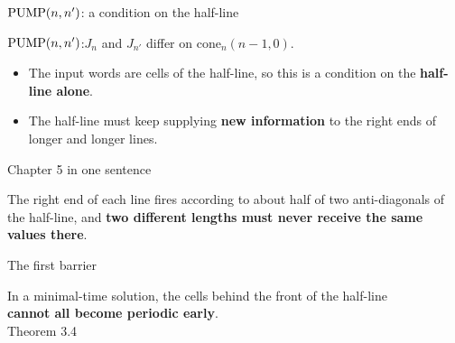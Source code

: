 \begin{frame}{$\mathrm{PUMP}(n,n')$: a condition on the half-line}
\vspace{2ex}
\begin{plainbox}
$\mathrm{PUMP}(n,n')$:\quad $J_n$ and $J_{n'}$ differ on $\mathrm{cone}_n(n-1,0)$.
\end{plainbox}
\vspace{2ex}
\begin{itemize}
\item The input words are cells of the half-line, so this is a condition on the \textbf{half-line alone}.
\item The half-line must keep supplying \textbf{new information} to the right ends of longer and longer lines.
\end{itemize}
\end{frame}

\begin{frame}{Chapter 5 in one sentence}
\vspace{4ex}
\begin{plainbox}\large
The right end of each line fires according to about half of two anti-diagonals of the half-line, and \textbf{two different lengths must never receive the same values there}.
\end{plainbox}
\end{frame}


\begin{frame}{The first barrier}
\vspace{5ex}
\begin{center}\Large
In a minimal-time solution, the cells behind the front of the half-line\\ \textbf{cannot all become periodic early}.\\[3ex]
\normalsize\color{mute} Theorem 3.4
\end{center}
\end{frame}

